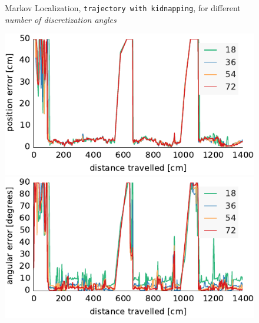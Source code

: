\documentclass[letterpaper, 10pt, conference]{ieeeconf}
\begin{document}
\begin{figure}

\begin{center}
Markov Localization, \texttt{trajectory with kidnapping}, for different \emph{number of discretization angles}
\end{center}
\includegraphics{ml-whole_random_long-xy}\hfill
\includegraphics{ml-whole_random_long-theta}

\vspace{.5em}


\end{figure}
\end{document}
